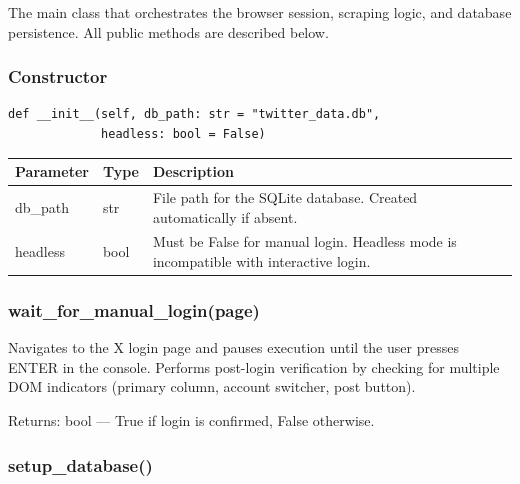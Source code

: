 \documentclass[11pt, a4paper]{article}
\def\method#1{#1}%
\def\param#1{#1}%
\def\pytype#1{#1}%
\def\returns#1{Returns: #1}%
\def\texttt#1{#1}%
\def\color#1{}%
\newcommand{\method}[1]{\texttt{\color{TwBlue}#1}}
\newcommand{\param}[1]{\texttt{\color{TwGreen!70!black}#1}}
\newcommand{\pytype}[1]{\texttt{\color{TwGray}#1}}
\newcommand{\returns}[1]{\textbf{Returns:} \texttt{#1}}
\begin{document}
The main class that orchestrates the browser session, scraping logic, and
database persistence. All public methods are described below.

\subsubsection{\texorpdfstring{Constructor}{Constructor}}

\begin{tcolorbox}[pybox, title={\texttt{\_\_init\_\_}}]
\begin{lstlisting}[style=pycode]
def __init__(self, db_path: str = "twitter_data.db",
             headless: bool = False)
\end{lstlisting}
\end{tcolorbox}

\begin{center}
\begin{tabularx}{\linewidth}{llX}
\toprule
\textbf{Parameter} & \textbf{Type} & \textbf{Description} \\
\midrule
\param{db\_path}  & \pytype{str}  & File path for the SQLite database. Created automatically if absent. \\
\param{headless}  & \pytype{bool} & Must be \texttt{False} for manual login. Headless mode is incompatible with interactive login. \\
\bottomrule
\end{tabularx}
\end{center}

\subsubsection{\texorpdfstring{\method{wait\_for\_manual\_login(page)}}{}}

Navigates to the X login page and pauses execution until the user presses
\texttt{ENTER} in the console. Performs post-login verification by checking
for multiple DOM indicators (primary column, account switcher, post button).

\returns{bool} --- \texttt{True} if login is confirmed, \texttt{False} otherwise.

\subsubsection{\texorpdfstring{\method{setup\_database()}}{}}
\end{document}
